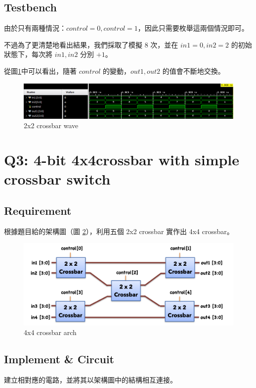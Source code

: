 \documentclass[10.5pt,compsoc,UTF8]{CjC}
\theoremstyle{mystyle}
\begin{document}
\subsection{Testbench}
由於只有兩種情況：$control = 0, control = 1$，因此只需要枚舉這兩個情況即可。
\par
不過為了更清楚地看出結果，我們採取了模擬 8 次，並在 $in1 = 0, in2 = 2$ 的初始狀態下，每次將 $in1, in2$ 分別 $+1$。 
\par
從圖\ref{fig:2x2_wave}中可以看出，隨著 $control$ 的變動，$out1, out2$ 的值會不斷地交換。

\begin{figure}[h]
    \centering
    \includegraphics[width=\textwidth]{2x2_wave.png}
      \caption{2x2 crossbar wave}
    \label{fig:2x2_wave}
\end{figure}

\section{Q3: 4-bit 4x4crossbar with simple crossbar switch}

\subsection{Requirement}
根據題目給的架構圖（圖 \ref{fig:4x4_spec}），利用五個 2x2 crossbar 實作出 4x4 crossbar。

\begin{figure}[h]
    \centering
    \includegraphics[width=\textwidth]{4x4_spec.png}
      \caption{4x4 crossbar arch}
    \label{fig:4x4_spec}
\end{figure}

\subsection{Implement \& Circuit}
建立相對應的電路，並將其以架構圖中的結構相互連接。
\end{document}
